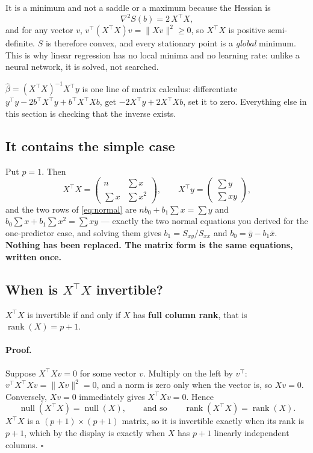 \documentclass[11pt]{article}
\newcommand{\Xt}{X^{\!\top}}
\begin{document}
It is a minimum and not a saddle or a maximum because the Hessian is
\[
  \nabla^2 S(b) = 2\,\Xt X,
\]
and for any vector $v$, $v^{\!\top}(\Xt X)v = \|Xv\|^2 \ge 0$, so $\Xt X$ is
positive semi-definite. $S$ is therefore convex, and every stationary point is
a \emph{global} minimum. This is why linear regression has no local minima and
no learning rate: unlike a neural network, it is solved, not searched.

\begin{keyidea}
$\hat\beta = (\Xt X)^{-1}\Xt y$ is one line of matrix calculus:
differentiate $y^{\!\top}y - 2b^{\!\top}\Xt y + b^{\!\top}\Xt X b$, get
$-2\Xt y + 2\Xt X b$, set it to zero. Everything else in this section is
checking that the inverse exists.
\end{keyidea}

\subsection{It contains the simple case}

Put $p = 1$. Then
\[
  \Xt X = \begin{pmatrix} n & \sum x\\ \sum x & \sum x^2\end{pmatrix},
  \qquad
  \Xt y = \begin{pmatrix} \sum y\\ \sum xy\end{pmatrix},
\]
and the two rows of \eqref{eq:normal} are $nb_0 + b_1\sum x = \sum y$ and
$b_0\sum x + b_1\sum x^2 = \sum xy$ --- exactly the two normal equations you
derived for the one-predictor case, and solving them gives
$b_1 = S_{xy}/S_{xx}$ and $b_0 = \bar y - b_1\bar x$. \textbf{Nothing has been
replaced. The matrix form is the same equations, written once.}

\subsection{\texorpdfstring{When is $\Xt X$ invertible?}{When is X\textquotesingle X invertible?}}
\label{sec:rank}

\begin{keyidea}
$\Xt X$ is invertible if and only if $X$ has \textbf{full column rank}, that
is $\operatorname{rank}(X) = p+1$.
\end{keyidea}

\paragraph{Proof.} Suppose $\Xt X v = 0$ for some vector $v$. Multiply on the
left by $v^{\!\top}$: $v^{\!\top}\Xt X v = \|Xv\|^2 = 0$, and a norm is zero
only when the vector is, so $Xv = 0$. Conversely, $Xv = 0$ immediately gives
$\Xt X v = 0$. Hence
\[
  \operatorname{null}(\Xt X) = \operatorname{null}(X),
  \qquad\text{and so}\qquad
  \operatorname{rank}(\Xt X) = \operatorname{rank}(X).
\]
$\Xt X$ is a $(p+1)\times(p+1)$ matrix, so it is invertible exactly when its
rank is $p+1$, which by the display is exactly when $X$ has $p+1$ linearly
independent columns. \hfill$\square$
\end{document}
